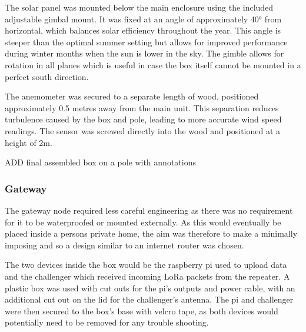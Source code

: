 The solar panel was mounted below the main enclosure using the included
adjustable gimbal mount. It was fixed at an angle of approximately 40° from
horizontal, which balances solar efficiency throughout the year. This angle is
steeper than the optimal summer setting but allows for improved performance
during winter months when the sun is lower in the sky. The gimble allows for
rotation in all planes which is useful in case the box itself cannot be mounted
in a perfect south direction. 

The anemometer was secured to a separate length of wood, positioned
approximately 0.5 metres away from the main unit. This separation reduces
turbulence caused by the box and pole, leading to more accurate wind speed
readings. The sensor was screwed directly into the wood and positioned at a
height of 2m.

ADD final assembled box on a pole with annotations

\subsubsection{Gateway}

The gateway node required less careful engineering as there was no requirement
for it to be waterproofed or mounted externally. As this would eventually be
placed inside a persons private home, the aim was therefore to make a minimally
imposing and so a design similar to an internet router was chosen.

The two devices inside the box would be the raspberry pi used to upload data and
the challenger which received incoming LoRa packets from the repeater. A plastic
box was used with cut outs for the pi's outputs and power cable, with an
additional cut out on the lid for the challenger's antenna. The pi and
challenger were then secured to the box's base with velcro tape, as both devices
would potentially need to be removed for any trouble shooting.